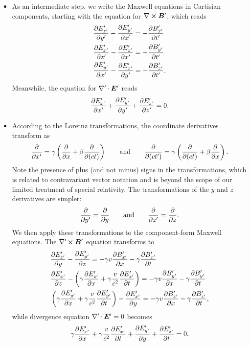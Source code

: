 \documentclass[11pt, a4paper]{article}
\newcommand{\eqtext}[1]{\qquad \text{#1} \qquad}
\renewcommand{\vec}[1]{\bm{#1}} %
\newcommand{\E}{\vec{E}} %
\newcommand{\B}{\vec{B}} %
\renewcommand{\curl}{\nabla \cross}
\newcommand{\divp}{\nabla' \mspace{-1mu} \cdot}  %
\newcommand{\curlp}{\nabla' \mspace{-2mu} \cross}
\begin{document}
\begin{itemize}
    \item As an intermediate step, we write the Maxwell equations in Cartisian components, starting with the equation for $ \curl \B' $, which reads
	\begin{align*}
		& \pdv{E'_{z'}}{y'} - \pdv{E'_{y'}}{z'} = - \pdv{B'_{x'}}{t'} \\ 
		&\pdv{E'_{x'}}{z'} - \pdv{E'_{z'}}{x'} = - \pdv{B'_{y'}}{t'}\\
		&\pdv{E'_{y'}}{x'} - \pdv{E'_{x'}}{y'} = - \pdv{B'_{z'}}{t'}.
	\end{align*}
    Meanwhile, the equation for $ \divp \E' $ reads
	\begin{equation*}
		\pdv{E'_{x'}}{x'} + 	\pdv{E'_{y'}}{y'} + 	\pdv{E'_{z'}}{z'} = 0.
	\end{equation*}
    
    \item According to the Loretnz transformations, the coordinate derivatives transform as
	\begin{equation*}
		\pdv{x'}  = \gamma \left(\pdv{x} + \beta \pdv{(ct)}\right) \eqtext{and} \pdv{(ct')} = \gamma \left(\pdv{(ct)} + \beta \pdv{x}\right).
	\end{equation*}
    Note the presence of plus (and not minus) signs in the transformations, which is related to contravariant vector notation and is beyond the scope of our limited treatment of special relativity. The transformations of the $ y $ and $ z $ derivatives are simpler:
	\begin{equation*}
		\pdv{y'} = \pdv{y} \eqtext{and} \pdv{z'} = \pdv{z}.
	\end{equation*}
    We then apply these transformations to the component-form Maxwell equations. The $ \curlp \B' $ equation transforms to
	\begin{align*}
		& \pdv{E'_{z'}}{y} - \pdv{E'_{y'}}{z} = - \gamma v \pdv{B'_{x'}}{x} - \gamma \pdv{B'_{x'}}{t}\\
		& \pdv{E'_{x'}}{z} - \left(\gamma \pdv{E'_{z'}}{x} + \gamma \frac{v}{c^{2}} \pdv{E'_{z'}}{t}\right) = - \gamma v \pdv{B'_{y'}}{x} - \gamma \pdv{B'_{y'}}{t}\\
		& \left(\gamma \pdv{E'_{y'}}{x} + \gamma \frac{v}{c^{2}}\pdv{E'_{y'}}{t}\right) - \pdv{E'_{x'}}{y} = - \gamma v \pdv{B'_{z'}}{x} - \gamma \pdv{B'_{z'}}{t},
	\end{align*}
	while divergence equation $ \divp \E' = 0$ becomes
	\begin{equation*}
		\gamma \pdv{E'_{x'}}{x} + \gamma \frac{v}{c^{2}} \pdv{E'_{x'}}{t} + \pdv{E'_{y'}}{y} + \pdv{E'_{z'}}{t} = 0.
	\end{equation*}
    

\end{itemize}
\end{document}
